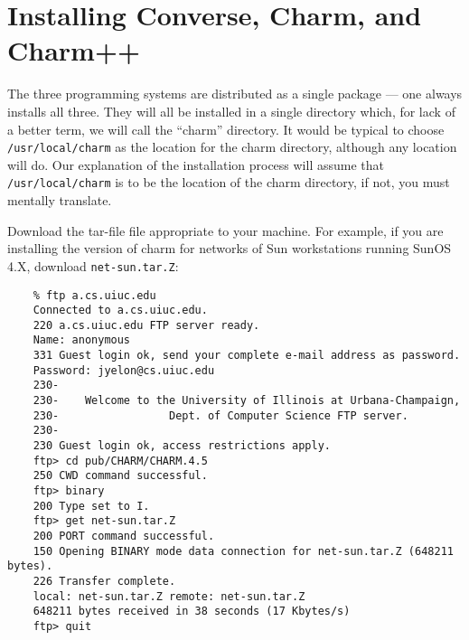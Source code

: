%
%
%
%
%
%
%
%
%
%
%
%
%

\section{Installing Converse, Charm, and Charm++}

The three programming systems are distributed as a single package ---
one always installs all three.  They will all be installed in a single
directory which, for lack of a better term, we will call the ``charm''
directory.  It would be typical to choose {\tt /usr/local/charm} as
the location for the charm directory, although any location will do.
Our explanation of the installation process will assume that {\tt
/usr/local/charm} is to be the location of the charm directory,
if not, you must mentally translate.

Download the tar-file file appropriate to your machine.  For example,
if you are installing the version of charm for networks of Sun
workstations running SunOS 4.X, download {\tt net-sun.tar.Z}:

\begin{verbatim}
    % ftp a.cs.uiuc.edu
    Connected to a.cs.uiuc.edu.
    220 a.cs.uiuc.edu FTP server ready.
    Name: anonymous
    331 Guest login ok, send your complete e-mail address as password.
    Password: jyelon@cs.uiuc.edu
    230-
    230-    Welcome to the University of Illinois at Urbana-Champaign,
    230-                 Dept. of Computer Science FTP server.
    230-
    230 Guest login ok, access restrictions apply.
    ftp> cd pub/CHARM/CHARM.4.5
    250 CWD command successful.
    ftp> binary
    200 Type set to I.
    ftp> get net-sun.tar.Z
    200 PORT command successful.
    150 Opening BINARY mode data connection for net-sun.tar.Z (648211 bytes).
    226 Transfer complete.
    local: net-sun.tar.Z remote: net-sun.tar.Z
    648211 bytes received in 38 seconds (17 Kbytes/s)
    ftp> quit
\end{verbatim}

